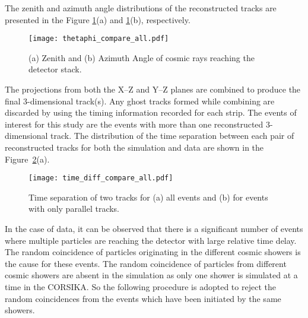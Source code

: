 The zenith and azimuth angle distributions of the reconstructed
tracks are presented in the Figure \ref{fig:thetaphi}(a) and
\ref{fig:thetaphi}(b), respectively.
\begin{figure}[h]
  \texttt{[image: thetaphi\_compare\_all.pdf]} 
  \caption{(a) Zenith and (b) Azimuth Angle of cosmic rays
    reaching the detector 
stack.}
  \label{fig:thetaphi}
\end{figure}
The projections from both the X--Z and Y--Z planes are combined
to produce the final 3-dimensional track(s). Any ghost tracks formed
while combining are discarded by using the timing information recorded
for each strip. The events of interest for this study are the
events with more than one reconstructed 3-dimensional track.
The distribution of the time separation between each pair of
reconstructed tracks for both the simulation and data are shown in the
Figure~\ref{fig:time_sep}(a).
\begin{figure}[h]
  \texttt{[image: time\_diff\_compare\_all.pdf]} 
  \caption{Time separation of two tracks for (a) all events and
    (b) for events with only parallel tracks.}
  \label{fig:time_sep}
\end{figure}
In the case of data, it can be observed that there is a significant
number of events where multiple particles are reaching the detector
with large relative time delay. The random coincidence of particles
originating in the different cosmic showers is the cause for these
events. The random coincidence of particles from different cosmic
showers are absent in the simulation as only one shower is simulated
at a time in the CORSIKA.
So the following procedure is adopted to reject the random
coincidences from the events which have been initiated by the same
showers.

